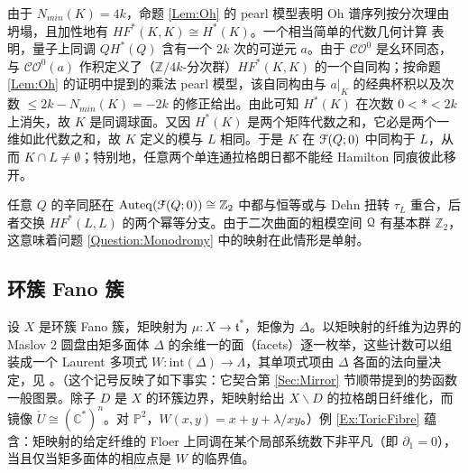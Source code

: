 \documentclass[11pt,a4paper]{article}
\numberwithin{equation}{section}
\newcommand{\bZ}{\mathbb{Z}}
\newcommand{\bC}{\mathbb{C}}
\newcommand{\bP}{\mathbb{P}}
\newcommand{\scrF}{\EuScript{F}}
\newcommand{\Cech}[1]{\check{#1}}
\newcommand{\Auteq}{\mathrm{Auteq}}
\providecommand{\frak}[1]{\mathfrak{#1}}
\begin{document}
由于 $N_{min}(K) = 4k$，命题 \ref{Lem:Oh} 的 pearl 模型表明 Oh 谱序列按分次理由坍塌，且加性地有 $HF^*(K,K) \cong H^*(K)$。一个相当简单的代数几何计算 \cite{Beauville} 表明，量子上同调 $QH^*(Q)$ 含有一个 $2k$ 次的可逆元 $a$。由于 $\mathcal{CO}^0$ 是幺环同态，与 $\mathcal{CO}^0(a)$ 作积定义了（$\bZ/4k$-分次群）$HF^*(K,K)$ 的一个自同构；按命题 \ref{Lem:Oh} 的证明中提到的乘法 pearl 模型，该自同构由与 $a|_K$ 的经典杯积以及次数 $\leq 2k-N_{min}(K) = -2k$ 的修正给出。由此可知 $H^*(K)$ 在次数 $0<\ast< 2k$ 上消失，故 $K$ 是同调球面。又因 $H^*(K)$ 是两个矩阵代数之和，它必是两个一维如此代数之和，故 $K$ 定义的模与 $L$ 相同。于是 $K$ 在 $\scrF(Q;0)$ 中同构于 $L$，从而 $K \cap L \neq \emptyset$；特别地，任意两个单连通拉格朗日都不能经 Hamilton 同痕彼此移开。


任意 $Q$ 的辛同胚在 $\Auteq(\scrF(Q;0)) \cong \bZ_2$ 中都与恒等或与 Dehn 扭转 $\tau_L$ 重合，后者交换 $HF^*(L,L)$ 的两个幂等分支。由于二次曲面的粗模空间 $\EuScript{Q}$ 有基本群 $\bZ_2$，这意味着问题 \ref{Question:Monodromy} 中的映射在此情形是单射。

\subsection{环簇 Fano 簇} 设 $X$ 是环簇 Fano 簇，矩映射为 $\mu: X \rightarrow \frak{t}^*$，矩像为 $\Delta$。以矩映射的纤维为边界的 Maslov 2 圆盘由矩多面体 $\Delta$ 的余维一的面（facets）逐一枚举，这些计数可以组装成一个 Laurent 多项式 $W: \mathrm{int}(\Delta) \rightarrow \Lambda$，其单项式项由 $\Delta$ 各面的法向量决定，见 \cite{Cho,Cho-Oh}。（这个记号反映了如下事实：它契合第 \ref{Sec:Mirror} 节顺带提到的势函数一般图景。除子 $D$ 是 $X$ 的环簇边界，矩映射给出 $X\backslash D$ 的拉格朗日纤维化，而镜像 $\Cech{U} \cong (\bC^*)^n$。对 $\bP^2$，$W(x,y) = x+y+\lambda/xy$。）例 \ref{Ex:ToricFibre} 蕴含：矩映射的给定纤维的 Floer 上同调在某个局部系统数下非平凡（即 $\partial_1 = 0$），当且仅当矩多面体的相应点是 $W$ 的临界值。

\end{document}

